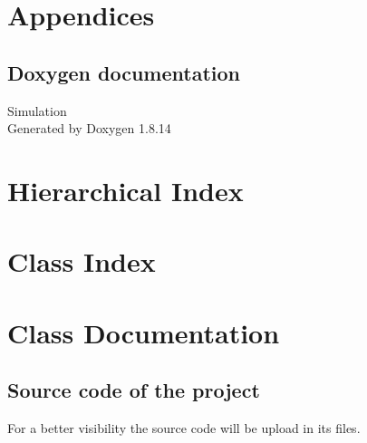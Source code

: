 \documentclass [10 pt, a4 paper]{report}
\newcommand{\clearemptydoublepage}{%
  \newpage{\pagestyle{empty}\cleardoublepage}%
}
\begin{document}
\chapter{Appendices}


\section{Doxygen documentation}




\begin{titlepage}
\vspace*{7cm}
\begin{center}%
{\Large Simulation }\\
\vspace*{1cm}
{\large Generated by Doxygen 1.8.14}\\
\end{center}
\end{titlepage}
\tableofcontents

\chapter{Hierarchical Index}

\chapter{Class Index}

\chapter{Class Documentation}


















\backmatter
\newpage
{}
\clearemptydoublepage
{}
\printindex







\clearpage
\section{Source code of the project}
For a better visibility the source code will be upload in its files.
\end{document}
